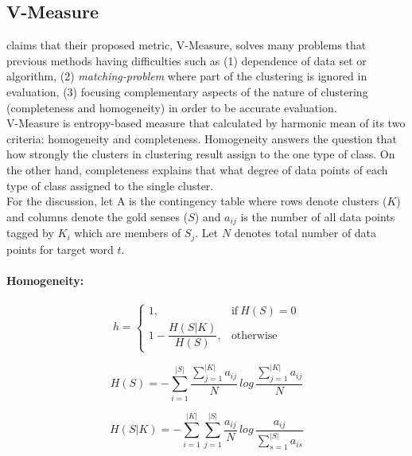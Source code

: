 \subsection{V-Measure}

\cite{rosenberg07vmeasure} claims that their proposed metric, V-Measure, solves many problems that previous methods having difficulties such as (1) dependence of data set or algorithm, (2) \emph{matching-problem} where part of the clustering is ignored in evaluation, (3) focusing complementary aspects of the nature of clustering (completeness and homogeneity) in order to be accurate evaluation. \\

V-Measure is entropy-based measure that calculated by harmonic mean of its two criteria: homogeneity and completeness. Homogeneity answers the question that how strongly the clusters in clustering result assign to the one type of class. On the other hand, completeness explains that what degree of data points of each type of class assigned to the single cluster. \\

For the discussion, let A is the contingency table where rows denote clusters ($K$) and columns denote the gold senses ($S$) and $a_{ij}$ is the number of all data points tagged by $K_i$ which are members of $S_j$. Let $N$ denotes total number of
data points for target word $t$.


\paragraph{Homogeneity:}


\begin{equation}
    h =
    \begin{cases}
      1, & \text{if}\ H(S) = 0 \\
      1 - \dfrac{H(S|K)}{H(S)}, & \text{otherwise}
    \end{cases}
  \end{equation}
  
\begin{equation}
H(S) = -\sum\limits_{i = 1}^{|S|} \dfrac{\sum_{j=1}^{|K|}a_{ij}}{N}\,log\, \dfrac{\sum_{j=1}^{|K|}a_{ij}}{N}
\end{equation}

\begin{equation}
H(S|K) = -\sum\limits_{i = 1}^{|K|} \sum\limits_{j = 1}^{|S|} \dfrac{a_{ij}}{N}\,log\, \dfrac{a_{ij}}{\sum_{s=1}^{|S|}a_{is}}
\end{equation}


